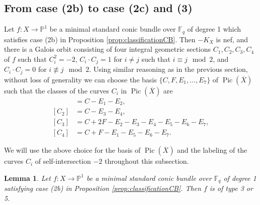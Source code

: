 \documentclass[a4paper, 11pt, reqno]{amsart}
\numberwithin{equation}{section} \numberwithin{figure}{section}
\DeclareMathOperator{\Pic}{Pic}
\def \F {{\mathbb F}}
\def \P {{\mathbb P}}
\newcommand{\ra}{\rightarrow}
\newtheorem{lemma}{Lemma}
\theoremstyle{definition}
\numberwithin{lemma}{section}
\begin{document}
\subsection{From case (2b) to case (2c) and (3)}\label{sec:case(2b)}
Let $f \colon X \ra \P^1$ be a minimal standard conic bundle over $\F_q$ of degree 1 which satisfies case (2b) in Proposition \ref{prop:classificationCB}. Then $-K_X$ is nef, and there is a Galois orbit consisting of four integral geometric sections $C_1, C_2, C_3, C_4$ of $f$ such that $C_i^2 = -2$,  $C_i \cdot C_j = 1$ for $i \neq j$ such that $i \equiv j \mod 2$, and $C_i \cdot C_j = 0$ for $i \not\equiv j \mod 2$. Using similar reasoning as in the previous section, without loss of generality we can choose the basis $\{C, F, E_1, \ldots, E_7\}$ of $\Pic(\overline{X})$ such that the classes of the curves $C_i$ in $\Pic(\overline{X})$ are
\begin{align*}
    [C_1] &= C - E_1 - E_2,\\
    [C_2] &= C - E_3 - E_4,\\
    [C_3] &= C + 2F - E_2 - E_3 - E_4 - E_5 - E_6 - E_7,\\
    [C_4] &= C + F - E_1 - E_5 - E_6 - E_7.
\end{align*}

We will use the above choice for the basis of $\Pic(\overline{X})$ and the labeling of the curves $C_i$ of self-intersection $-2$ throughout this subsection. 

\begin{lemma}\label{lem:(3)type3type5}
    Let $f \colon X \ra \P^1$ be a minimal standard conic bundle over $\F_q$ of degree 1 satisfying case (2b) in Proposition \ref{prop:classificationCB}. Then $f$ is of type 3 or 5.
\end{lemma}
\end{document}
